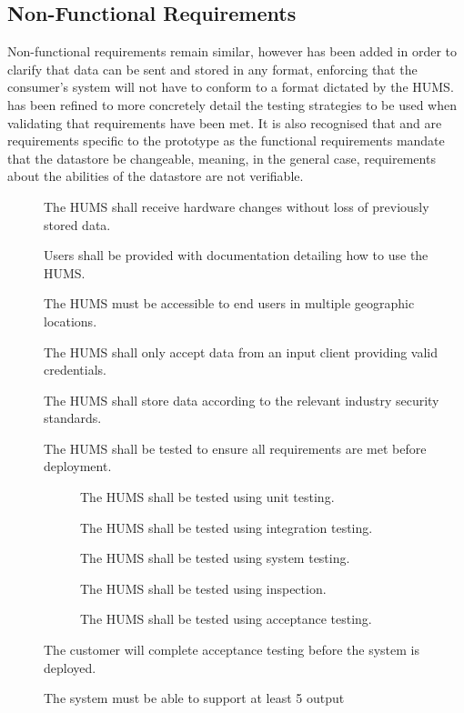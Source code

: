 \subsection{Non-Functional Requirements}
Non-functional requirements remain similar, however  has been 
added in order to clarify that data can be sent and stored in any format, 
enforcing that the consumer's system will not have to conform to a format
dictated by the HUMS.  has been refined to more concretely detail the
testing strategies to be used when validating that requirements have been met.
It is also recognised that  and  are requirements 
specific to the prototype as the functional requirements mandate that the 
datastore be changeable, meaning, in the general case, requirements 
about the abilities of the datastore are not verifiable.
\begin{description}
	\item[] The HUMS shall receive hardware changes without loss 
	of previously stored data.
	\item[]  Users shall be provided with documentation detailing 
	how 	to use the HUMS.
	\item[] The HUMS must be accessible to end users in multiple 	
	geographic locations.
	\item[]  The HUMS shall only accept data from an input client 	
	providing valid credentials. 
	\item[] The HUMS shall store data according to the relevant 	
	industry security standards. 
	\item[]  The HUMS shall be tested to ensure all requirements are 
	met before deployment.
	\begin{description}
	\item[]  The HUMS shall be tested using unit testing.
	\item[]  The HUMS shall be tested using integration testing.
	\item[]  The HUMS shall be tested using system testing.
	\item[]  The HUMS shall be tested using inspection.
	\item[]  The HUMS shall be tested using acceptance testing.
	\end{description}
	\item[] The customer will complete acceptance testing before the 
	system is deployed.
	\item[] The system must be able to support at least 5 output 

\end{description}
